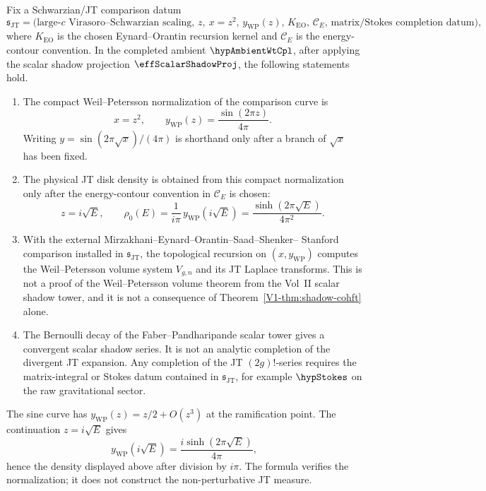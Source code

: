 \begin{proposition}
\label{prop:gravity-jt}
Fix a Schwarzian/JT comparison datum
\[
\mathfrak s_{\mathrm{JT}}
=
\bigl(\text{large-}c\text{ Virasoro--Schwarzian scaling},\,
z,\ x=z^2,\,
y_{\mathrm{WP}}(z),\,
K_{\mathrm{EO}},\,
\mathcal C_E,\,
\text{matrix/Stokes completion datum}\bigr),
\]
where \(K_{\mathrm{EO}}\) is the chosen Eynard--Orantin recursion
kernel and \(\mathcal C_E\) is the energy-contour convention. In the
completed ambient \(\hypAmbientWtCpl\), after applying the scalar
shadow projection \(\effScalarShadowProj\), the following statements
hold.
\begin{enumerate}[label=\textup{(\roman*)}]
\item The compact Weil--Petersson normalization of the comparison
curve is
\[
x=z^2,\qquad
y_{\mathrm{WP}}(z)=\frac{\sin(2\pi z)}{4\pi}.
\]
Writing \(y=\sin(2\pi\sqrt{x})/(4\pi)\) is shorthand only after a
branch of \(\sqrt{x}\) has been fixed.
\item The physical JT disk density is obtained from this compact
normalization only after the energy-contour convention in
\(\mathcal C_E\) is chosen:
\[
z=i\sqrt{E},\qquad
\rho_0(E)=\frac{1}{i\pi}\,y_{\mathrm{WP}}(i\sqrt{E})
        =\frac{\sinh(2\pi\sqrt{E})}{4\pi^2}.
\]
\item With the external Mirzakhani--Eynard--Orantin--Saad--Shenker--
Stanford comparison installed in \(\mathfrak s_{\mathrm{JT}}\), the
topological recursion on \((x,y_{\mathrm{WP}})\) computes the
Weil--Petersson volume system \(V_{g,n}\) and its JT Laplace
transforms. This is not a proof of the Weil--Petersson volume theorem
from the Vol~II scalar shadow tower, and it is not a consequence of
Theorem~\textup{\ref*{V1-thm:shadow-cohft}} alone.
\item The Bernoulli decay of the Faber--Pandharipande scalar tower
gives a convergent scalar shadow series. It is not an analytic
completion of the divergent JT expansion. Any completion of the
JT \((2g)!\)-series requires the matrix-integral or Stokes datum
contained in \(\mathfrak s_{\mathrm{JT}}\), for example
\(\hypStokes\) on the raw gravitational sector.
\end{enumerate}
\end{proposition}

\begin{remark}
The sine curve has \(y_{\mathrm{WP}}(z)=z/2+O(z^3)\) at the
ramification point. The continuation \(z=i\sqrt E\) gives
\[
y_{\mathrm{WP}}(i\sqrt E)
=\frac{i\sinh(2\pi\sqrt E)}{4\pi},
\]
hence the density displayed above after division by \(i\pi\). The
formula verifies the normalization; it does not construct the
non-perturbative JT measure.
\end{remark}

